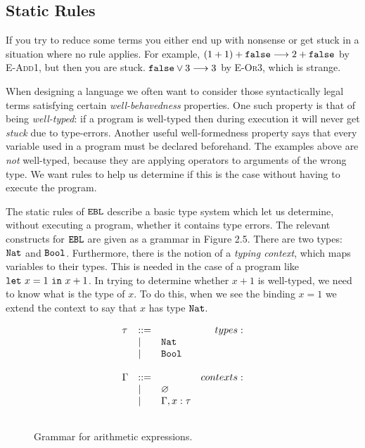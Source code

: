 \subsection{Static Rules}

If you try to reduce some terms you either end up with nonsense or get stuck in a situation where no rule applies. For example, $(1+1)+\mathtt{false} \longrightarrow 2 + \mathtt{false}$ by \textsc{E-Add1}, but then you are stuck. $\mathtt{false} \lor 3 \longrightarrow 3$ by \textsc{E-Or3}, which is strange.

When designing a language we often want to consider those syntactically legal terms satisfying certain \textit{well-behavedness} properties. One such property is that of being \textit{well-typed}: if a program is well-typed then during execution it will never get \textit{stuck} due to type-errors. Another useful well-formedness property says that every variable used in a program must be declared beforehand. The examples above are \textit{not} well-typed, because they are applying operators to arguments of the wrong type. We want rules to help us determine if this is the case without having to execute the program.

The static rules of $\mathtt{EBL}$ describe a basic type system which let us determine, without executing a program, whether it contains type errors. The relevant constructs for $\mathtt{EBL}$ are given as a grammar in Figure 2.5. There are two types: $\mathtt{Nat}$ and $\mathtt{Bool}$. Furthermore, there is the notion of a \textit{typing context}, which maps variables to their types. This is needed in the case of a program like $\mathtt{let}~ x = 1~\mathtt{in}~ x+1$. In trying to determine whether $x+1$ is well-typed, we need to know what is the type of $x$. To do this, when we see the binding $x=1$ we extend the context to say that $x$ has type $\mathtt{Nat}$.


\begin{figure}[h]

\[
\begin{array}{c}

\begin{array}{lllr}

\tau & ::= & ~ & types: \\
	& | & \mathtt{Nat} \\
	& | & \mathtt{Bool} \\
	&&\\
	
\Gamma & ::= & ~ & contexts: \\
	& | & \varnothing \\
	& | & \Gamma, x: \tau \\
	&&\\
\end{array}

\end{array}
\]

\vspace{-12pt}
\caption{Grammar for arithmetic expressions.}
\label{A sample. }
\end{figure}

